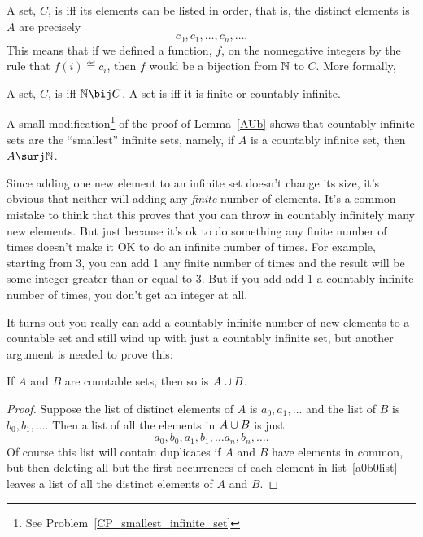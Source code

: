 A set, $C$, is  iff its elements can be listed in order,
that is, the distinct elements is $A$ are precisely
\[
c_0, c_1, \dots, c_n, \dots.
\]
This means that if we defined a function, $f$, on the nonnegative integers
by the rule that $f(i) \eqdef c_i$, then $f$ would be a bijection from
$\mathbb{N}$ to $C$.  More formally,

\begin{definition}
  A set, $C$, is  iff $\naturals \bij C$.  A set
  is  iff it is finite or countably infinite.
\end{definition}

A small modification\footnote{See Problem~\ref{CP_smallest_infinite_set}}
of the proof of Lemma~\ref{AUb} shows that countably infinite sets are
the ``smallest'' infinite sets, namely, if $A$ is a countably infinite
set, then $A \surj \naturals$.

Since adding one new element to an infinite set doesn't change its
size, it's obvious that neither will adding any \emph{finite} number
of elements.  It's a common mistake to think that this proves that you
can throw in countably infinitely many new elements.  But just because
it's ok to do something any finite number of times doesn't make it OK
to do an infinite number of times.  For example, starting from 3, you
can add 1 any finite number of times and the result will be some
integer greater than or equal to 3.  But if you add add 1 a countably
infinite number of times, you don't get an integer at all.

It turns out you really can add a countably infinite number of new
elements to a countable set and still wind up with just a countably
infinite set, but another argument is needed to prove this:

\begin{lemma}\label{countable-union}
If $A$ and $B$ are countable sets, then so is $A \cup B$.
\end{lemma}

\begin{proof}
Suppose the list of distinct elements of $A$ is $a_0,a_1,\dots$ and the
list of $B$ is $b_0,b_1, \dots$.  Then a list of all the elements in $A
\cup B$ is just
\begin{equation}\label{a0b0list}
a_0,b_0,a_1,b_1, \dots a_n,b_n, \dots.
\end{equation}
Of course this list will contain duplicates if $A$ and $B$ have elements
in common, but then deleting all but the first occurrences of each element in
list~\eqref{a0b0list} leaves a list of all the distinct elements of $A$
and $B$.
\end{proof}

